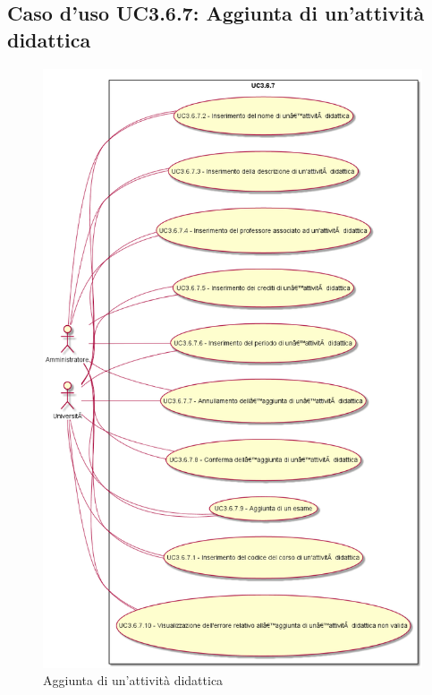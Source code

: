 \subsection{Caso d'uso \texorpdfstring{UC3.6.7}{UC3.6.7}: Aggiunta di un'attività didattica}
\begin{figure} [H]
\centering
\includegraphics[scale=0.45]{./img/UC3-6-7.png}
\caption{Aggiunta di un'attività didattica}\label{}
\end{figure}

